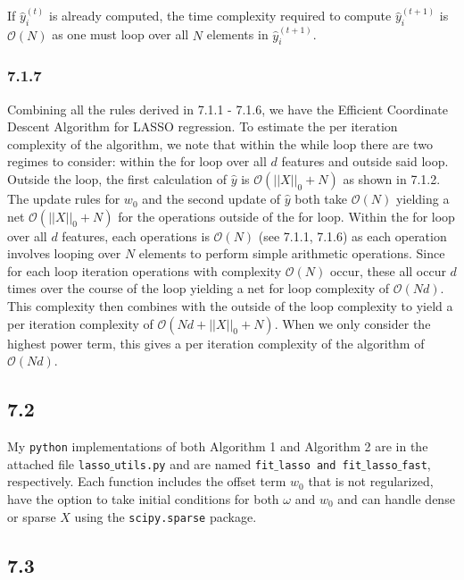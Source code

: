 \documentclass[12pt]{amsart}
\begin{document}
If $\hat{y}_i^{(t)}$ is already computed, the time complexity required to compute $\hat{y}_i^{(t+1)}$ is $\mathcal{O}(N)$ as one must loop over all $N$ elements in $\hat{y}_i^{(t+1)}$.

\subsubsection*{7.1.7}

Combining all the rules derived in 7.1.1 - 7.1.6, we have the Efficient Coordinate Descent Algorithm for LASSO regression.  To estimate the per iteration complexity of the algorithm, we note that within the while loop there are two regimes to consider: within the for loop over all $d$ features and outside said loop.  Outside the loop, the first calculation of $\hat{y}$ is $\mathcal{O}(||X||_0 + N)$ as shown in 7.1.2.  The update rules for $w_0$ and the second update of $\hat{y}$ both take $\mathcal{O}(N)$ yielding a net $\mathcal{O}(||X||_0 + N)$ for the operations outside of the for loop.  Within the for loop over all $d$ features, each operations is $\mathcal{O}(N)$ (see 7.1.1, 7.1.6) as each operation involves looping over $N$ elements to perform simple arithmetic operations.  Since for each loop iteration operations with complexity $\mathcal{O}(N)$ occur, these all occur $d$ times over the course of the loop yielding a net for loop complexity of $\mathcal{O}(Nd)$.  This complexity then combines with the outside of the loop complexity to yield a per iteration complexity of $\mathcal{O}(Nd + ||X||_0 + N)$.  When we only consider the highest power term, this gives a per iteration complexity of the algorithm of $\mathcal{O}(Nd)$.

\subsection*{7.2}

My {\tt python} implementations of both Algorithm 1 and Algorithm 2 are in the attached file {\tt lasso$\_$utils.py} and are named {\tt fit$\_$lasso and fit$\_$lasso$\_$fast}, respectively.  Each function includes the offset term $w_0$ that is not regularized, have the option to take initial conditions for both $\omega$ and $w_0$ and can handle dense or sparse $X$ using the {\tt scipy.sparse} package.

\subsection*{7.3}
\end{document}
